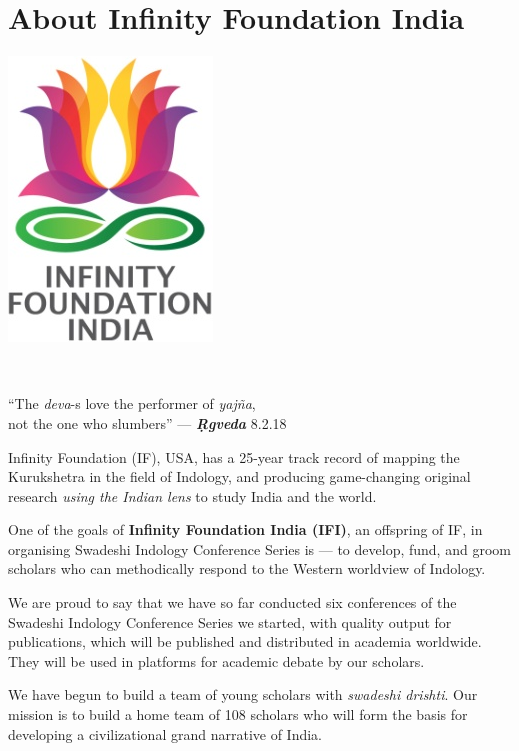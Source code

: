 
\chapter*{About Infinity Foundation India}\label{about}

\vspace{-1cm}

\begin{center}
\includegraphics[scale=0.23]{images/logo.png}
\end{center}

\begin{center}
\\
\end{center}

\begin{center}
“The \textit{deva}-s love the performer of \textit{yajña},\\ not the one who slumbers” — \textbf{\textit{Ṛgveda}} 8.2.18
\end{center}

Infinity Foundation (IF), USA, has a 25-year track record of mapping the Kurukshetra in the field of Indology, and producing game-changing original research \textit{using the Indian lens} to study India and the world.

One of the goals of \textbf{Infinity Foundation India (IFI)}, an offspring of IF, in organising Swadeshi Indology Conference Series is — to develop, fund, and groom scholars who can methodically respond to the Western worldview of Indology.

We are proud to say that we have so far conducted six conferences of the Swadeshi Indology Conference Series we started, with quality output for publications, which will be published and distributed in academia worldwide. They will be used in platforms for academic debate by our scholars.

We have begun to build a team of young scholars with \textit{swadeshi drishti}. Our mission is to build a home team of 108 scholars who will form the basis for developing a civilizational grand narrative of India.

